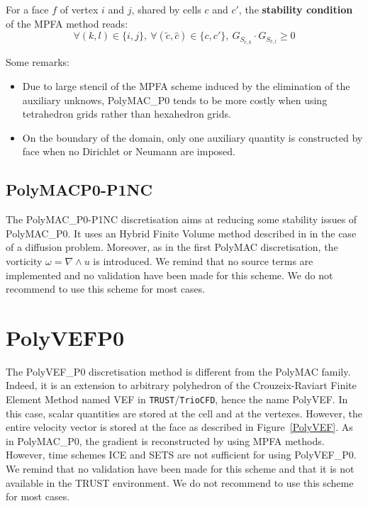For a face $f$ of vertex $i$ and $j$, shared by cells $c$ and $c'$, the \textbf{stability condition} of the MPFA method reads:
\begin{equation}
    \forall (k,l) \in \{i,j\}, \ \forall (\tilde{c},\hat{c})\in \{c,c' \}, \ G_{S_{\tilde{c},k}} \cdot G_{S_{\hat{c},l}} \geq 0 \label{MPFA_stability_cdt}
\end{equation}

Some remarks:
{
\it
\begin{itemize} 
    \item  Due to large stencil of the MPFA scheme induced by the elimination of the auxiliary unknows, PolyMAC\_P0 tends to be more costly when using tetrahedron grids rather than hexahedron grids.
    \item  On the boundary of the domain, only one auxiliary quantity is constructed by face when no Dirichlet or Neumann are imposed. 
\end{itemize}
}

\subsection{PolyMAC\textunderscore{}P0-P1NC}
The PolyMAC\_P0-P1NC discretisation aims at reducing some stability issues of PolyMAC\_P0. It uses an Hybrid Finite Volume method described in \cite{eymard2007} in the case of a diffusion problem. Moreover, as in the first PolyMAC discretisation, the vorticity $\omega = \nabla \wedge u$ is introduced. We remind that no source terms are implemented and no validation have been made for this scheme. We do not recommend to use this scheme for most cases.

\section{PolyVEF\textunderscore{}P0\label{sec:polyvef}}
The PolyVEF\_P0 discretisation method is different from the PolyMAC family. Indeed, it is an extension to arbitrary polyhedron of the Crouzeix-Raviart Finite Element Method named VEF in \texttt{TRUST}/\texttt{TrioCFD}, hence the name PolyVEF. In this case, scalar quantities are stored at the cell and at the vertexes. However, the entire velocity vector is stored at the face as described in Figure~\ref{PolyVEF}. As in PolyMAC\_P0, the gradient is reconstructed by using MPFA methods. 
However, time schemes ICE and SETS are not sufficient for using PolyVEF\_P0. We remind that no validation have been made for this scheme and that it is not available in the TRUST environment. We do not recommend to use this scheme for most cases.

